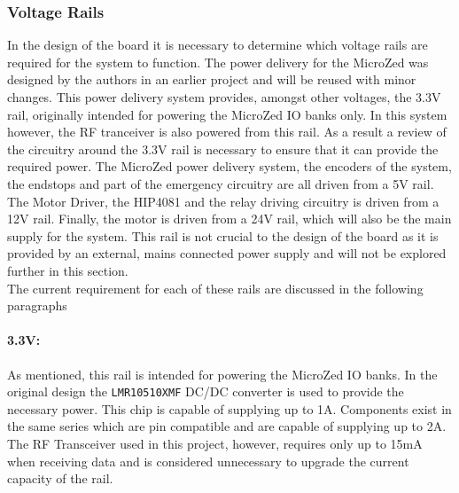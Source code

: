 \subsubsection{Voltage Rails} %
\label{subsub:voltage_rails}
In the design of the board it is necessary to determine which voltage rails are required for the system to function.
The power delivery for the MicroZed was designed by the authors in an earlier project \cite{isaswarm} and will be reused with minor changes.
This power delivery system provides, amongst other voltages, the 3.3V rail, originally intended for powering the MicroZed IO banks only.
In this system however, the RF tranceiver is also powered from this rail.
As a result a review of the circuitry around the 3.3V rail is necessary to ensure that it can provide the required power.
The MicroZed power delivery system, the encoders of the system, the endstops and part of the emergency circuitry are all driven from a 5V rail.
The Motor Driver, the HIP4081 \cite{driver} and the relay driving circuitry is driven from a 12V rail.
Finally, the motor is driven from a 24V rail, which will also be the main supply for the system.
This rail is not crucial to the design of the board as it is provided by an external, mains connected power supply and will not be explored further in this section.\\
The current requirement for each of these rails are discussed in the following paragraphs

\paragraph{3.3V:} %
\label{par:3_3v}
As mentioned, this rail is intended for powering the MicroZed IO banks.
In the original design the \texttt{LMR10510XMF} DC/DC converter is used to provide the necessary power.
This chip is capable of supplying up to 1A.
Components exist in the same series which are pin compatible and are capable of supplying up to 2A.
The RF Transceiver used in this project, however, requires only up to 15mA when receiving data and is considered unnecessary to upgrade the current capacity of the rail.

